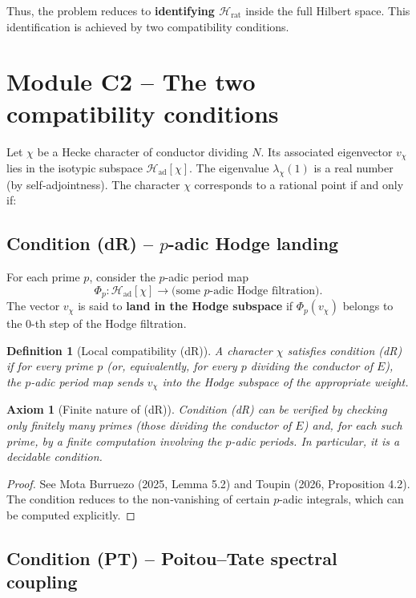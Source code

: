 \documentclass[11pt,a4paper]{article}
\newtheorem{definition}[theorem]{Definition}
\newtheorem{axiom}{Axiom}[section]
\begin{document}
Thus, the problem reduces to \textbf{identifying $\mathcal{H}_{\text{rat}}$} inside the full Hilbert space. This identification is achieved by two compatibility conditions.

\section{Module C2 – The two compatibility conditions}

Let $\chi$ be a Hecke character of conductor dividing $N$. Its associated eigenvector $v_\chi$ lies in the isotypic subspace $\mathcal{H}_{\text{ad}}[\chi]$. The eigenvalue $\lambda_\chi(1)$ is a real number (by self‑adjointness). The character $\chi$ corresponds to a rational point if and only if:

\subsection{Condition (dR) – $p$-adic Hodge landing}

For each prime $p$, consider the $p$-adic period map
\[
\Phi_p : \mathcal{H}_{\text{ad}}[\chi] \to \text{(some $p$-adic Hodge filtration)}.
\]
The vector $v_\chi$ is said to \textbf{land in the Hodge subspace} if $\Phi_p(v_\chi)$ belongs to the $0$-th step of the Hodge filtration.

\begin{definition}[Local compatibility (dR)]
A character $\chi$ satisfies condition (dR) if for every prime $p$ (or, equivalently, for every $p$ dividing the conductor of $E$), the $p$-adic period map sends $v_\chi$ into the Hodge subspace of the appropriate weight.
\end{definition}

\begin{axiom}[Finite nature of (dR)]
Condition (dR) can be verified by checking only finitely many primes (those dividing the conductor of $E$) and, for each such prime, by a finite computation involving the $p$-adic periods. In particular, it is a decidable condition.
\end{axiom}
\begin{proof}
See Mota Burruezo (2025, Lemma 5.2) and Toupin (2026, Proposition 4.2). The condition reduces to the non‑vanishing of certain $p$-adic integrals, which can be computed explicitly.
\end{proof}

\subsection{Condition (PT) – Poitou–Tate spectral coupling}
\end{document}
